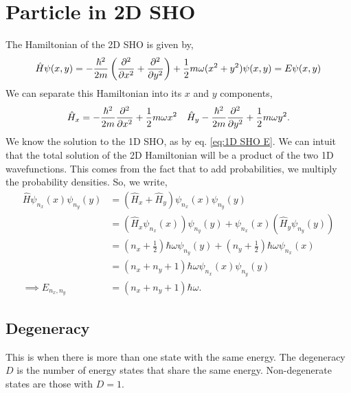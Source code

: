 \documentclass{book}
\begin{document}
\section{Particle in 2D SHO}
The Hamiltonian of the 2D SHO is given by,
\begin{equation}
	\hat{H}\psi(x,y) = -\frac{\hbar^2}{2m}\left(\pdv[2]{x} + \pdv[2]{y}\right) + \frac{1}{2}m\omega (x^2 + y^2)\psi(x,y) = E\psi(x,y)
\end{equation}
We can separate this Hamiltonian into its $x$ and $y$ components,
\begin{align}
	\hat{H}_x = -\frac{\hbar^2}{2m}\pdv[2]{x} + \frac{1}{2}m\omega x^2 && \hat{H}_y -\frac{\hbar^2}{2m}\pdv[2]{y} + \frac{1}{2}m\omega y^2.
\end{align}
We know the solution to the 1D SHO, as by eq. \eqref{eq:1D SHO E}. We can intuit that the total solution of the 2D Hamiltonian will be a product of the two 1D wavefunctions. This comes from the fact that to add probabilities, we multiply the probability densities. So, we write,
\begin{equation}
	\begin{split}
		\hat{H}\psi_{n_x}(x)\psi_{n_y}(y) & = \left(\hat{H}_x + \hat{H}_y\right)\psi_{n_x}(x)\psi_{n_y}(y) \\
		& = \left(\hat{H}_x\psi_{n_x}(x)\right) \psi_{n_y}(y) + \psi_{n_x}(x)\left(\hat{H}_y\psi_{n_y}(y)\right) \\
		& = \left(n_x + \frac{1}{2}\right)\hbar\omega \psi_{n_y}(y) + \left(n_y + \frac{1}{2}\right)\hbar \omega \psi_{n_x}(x) \\
		& = \left(n_x + n_y + 1\right)\hbar \omega \psi_{n_x}(x)\psi_{n_y}(y) \\
		\implies E_{n_x,n_y} &= (n_x + n_y + 1)\hbar \omega.
	\end{split}
\end{equation}
\subsection{Degeneracy}
This is when there is more than one state with the same energy. The degeneracy $D$ is the number of energy states that share the same energy. Non-degenerate states are those with $D = 1$. 
\end{document}
